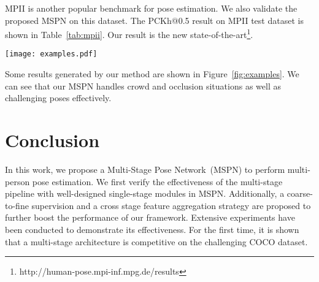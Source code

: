 \documentclass[10pt,twocolumn,letterpaper]{article}
\begin{document}
MPII is another popular benchmark for pose estimation. We also validate the proposed MSPN on this dataset. The PCKh@0.5 result on MPII test dataset is shown in Table~\ref{tab:mpii}. Our result is the new state-of-the-art\footnote{http://human-pose.mpi-inf.mpg.de/results}.

\begin{figure*}[t]
	\begin{center} 
		\texttt{[image: examples.pdf]} 
	\end{center} 
	\caption{Visualization of MSPN results on COCO minival dataset.} 
	\label{fig:examples} 
\end{figure*} 

Some results generated by our method are shown in Figure~\ref{fig:examples}. We can see that our MSPN handles crowd and occlusion situations as well as challenging poses effectively.

\section{Conclusion}
In this work, we propose a Multi-Stage Pose Network~(MSPN) to perform multi-person pose estimation. We first verify the effectiveness of the multi-stage pipeline with well-designed single-stage modules in MSPN. Additionally, a coarse-to-fine supervision and a cross stage feature aggregation strategy are proposed to further boost the performance of our framework. Extensive experiments have been conducted to demonstrate its effectiveness. For the first time, it is shown that a multi-stage architecture is competitive on the challenging COCO dataset.

{\small
	
	
}
\end{document}

